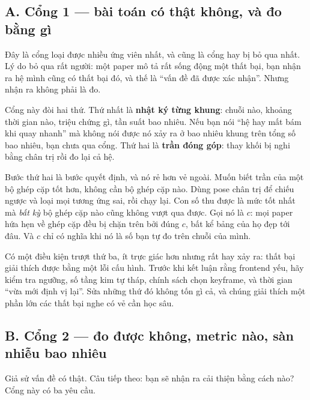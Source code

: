 \documentclass[../../deep_learning.tex]{subfiles}
\begin{document}
\subsection{A. Cổng 1 --- bài toán có thật không, và đo bằng gì}
Đây là cổng loại được nhiều ứng viên nhất, và cũng là cổng hay bị bỏ qua nhất. Lý do bỏ qua rất người: một paper mô tả rất sống động một thất bại, bạn nhận ra hệ mình cũng có thất bại đó, và thế là ``vấn đề đã được xác nhận''. Nhưng nhận ra không phải là đo.

Cổng này đòi hai thứ. Thứ nhất là \textbf{nhật ký từng khung}: chuỗi nào, khoảng thời gian nào, triệu chứng gì, tần suất bao nhiêu. Nếu bạn nói ``hệ hay mất bám khi quay nhanh'' mà không nói được nó xảy ra ở bao nhiêu khung trên tổng số bao nhiêu, bạn chưa qua cổng. Thứ hai là \textbf{trần đóng góp}: thay khối bị nghi bằng chân trị rồi đo lại cả hệ.

Bước thứ hai là bước quyết định, và nó rẻ hơn vẻ ngoài. Muốn biết trần của một bộ ghép cặp tốt hơn, không cần bộ ghép cặp nào. Dùng pose chân trị để chiếu ngược và loại mọi tương ứng sai, rồi chạy lại. Con số thu được là mức tốt nhất mà \emph{bất kỳ} bộ ghép cặp nào cũng không vượt qua được. Gọi nó là \(c\): mọi paper hứa hẹn về ghép cặp đều bị chặn trên bởi đúng \(c\), bất kể bảng của họ đẹp tới đâu. Và \(c\) chỉ có nghĩa khi nó là số bạn tự đo trên chuỗi của mình.

Có một điều kiện trượt thứ ba, ít trực giác hơn nhưng rất hay xảy ra: thất bại giải thích được bằng một lỗi cấu hình. Trước khi kết luận rằng frontend yếu, hãy kiểm tra ngưỡng, số tầng kim tự tháp, chính sách chọn keyframe, và thời gian ``vừa mới định vị lại''. Sửa những thứ đó không tốn gì cả, và chúng giải thích một phần lớn các thất bại nghe có vẻ cần học sâu.

\subsection{B. Cổng 2 --- đo được không, metric nào, sàn nhiễu bao nhiêu}
Giả sử vấn đề có thật. Câu tiếp theo: bạn sẽ nhận ra cải thiện bằng cách nào? Cổng này có ba yêu cầu.
\end{document}

